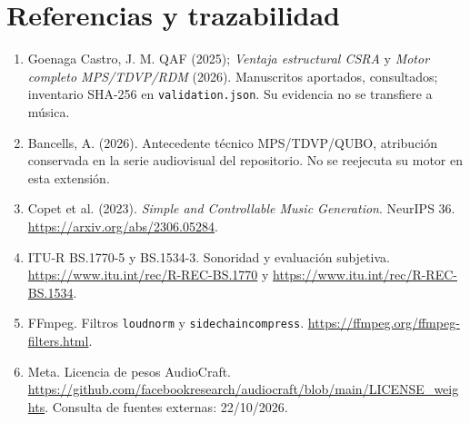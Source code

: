 \documentclass[11pt,a4paper]{article}
\begin{document}
\section*{Referencias y trazabilidad}
\begin{enumerate}\small
\item Goenaga Castro, J. M. QAF (2025); \emph{Ventaja estructural CSRA} y \emph{Motor completo MPS/TDVP/RDM} (2026). Manuscritos aportados, consultados; inventario SHA-256 en \texttt{validation.json}. Su evidencia no se transfiere a música.
\item Bancells, A. (2026). Antecedente técnico MPS/TDVP/QUBO, atribución conservada en la serie audiovisual del repositorio. No se reejecuta su motor en esta extensión.
\item Copet et al. (2023). \emph{Simple and Controllable Music Generation}. NeurIPS 36. \url{https://arxiv.org/abs/2306.05284}.
\item ITU-R BS.1770-5 y BS.1534-3. Sonoridad y evaluación subjetiva. \url{https://www.itu.int/rec/R-REC-BS.1770} y \url{https://www.itu.int/rec/R-REC-BS.1534}.
\item FFmpeg. Filtros \texttt{loudnorm} y \texttt{sidechaincompress}. \url{https://ffmpeg.org/ffmpeg-filters.html}.
\item Meta. Licencia de pesos AudioCraft. \url{https://github.com/facebookresearch/audiocraft/blob/main/LICENSE_weights}. Consulta de fuentes externas: 22/10/2026.
\end{enumerate}
\end{document}
